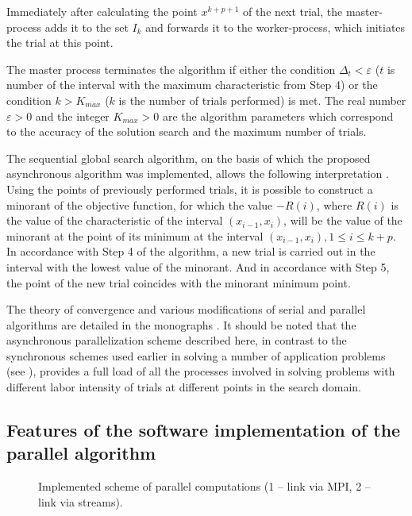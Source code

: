 \documentclass[mathematics,article,submit,pdftex,moreauthors]{Definitions/mdpi}
\begin{document}
Immediately after calculating the point $x^{k+p+1}$ of the next trial, the master-process adds it to the set $I_k$ and forwards it to the worker-process, which initiates the trial at this point. 

The master process terminates the algorithm if either the condition $\Delta_{t}<\varepsilon$ ($t$ is number of the interval with the maximum characteristic from Step 4) or the condition $k>K_{max}$ ($k$ is the number of trials performed) is met.
The real number $\varepsilon>0$ and the integer $K_{max}>0$ are the algorithm parameters which correspond to the accuracy of the solution search and the maximum number of trials.

The sequential global search algorithm, on the basis of which the proposed asynchronous algorithm was implemented, allows the following interpretation \cite{Molinaro2001}. Using the points of previously performed trials, it is possible to construct a minorant of the objective function, for which the value $-R(i)$, where $R(i)$ is the value of the characteristic of the interval $(x_{i-1}, x_i)$, will be the value of the minorant at the point of its minimum at the interval $(x_{i-1},x_i), 1\leq i\leq k+p$. In accordance with Step 4 of the algorithm, a new trial is carried out in the interval with the lowest value of the minorant. And in accordance with Step 5, the point of the new trial coincides with the minorant minimum point.

The theory of convergence and various modifications of serial and parallel algorithms are detailed in the monographs \cite{Strongin2000,Sergeyev2017}. 
It should be noted that the asynchronous parallelization scheme described here, in contrast to the synchronous schemes used earlier in solving a number of application problems (see \cite{Kalyulin2017, Modorskii2016}), provides a full load of all the processes involved in solving problems with different labor intensity of trials at different points in the search domain.


\subsection{Features of the software implementation of the parallel algorithm}

\begin{figure}
\caption{Implemented scheme of parallel computations (1 -- link via MPI, 2 -- link via streams).}\label{fig:Impl}
\end{figure}   
\end{document}
